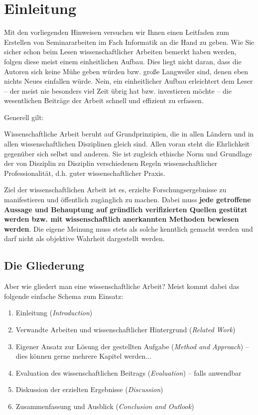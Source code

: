 \section{Einleitung}
\label{sec_einleitung}

\noindent
Mit den vorliegenden Hinweisen versuchen wir Ihnen einen Leitfaden zum Erstellen von Seminararbeiten im Fach Informatik an die Hand zu geben.
Wie Sie sicher schon beim Lesen wissenschaftlicher Arbeiten bemerkt haben werden, folgen diese meist einem einheitlichen Aufbau.
Dies liegt nicht daran, dass die Autoren sich keine Mühe geben würden bzw. große Langweiler sind, denen eben nichts Neues einfallen würde.
Nein, ein einheitlicher Aufbau erleichtert dem Leser -- der meist nie besonders viel Zeit übrig hat bzw. investieren möchte -- die wesentlichen Beiträge der Arbeit schnell und effizient zu erfassen.

\medskip

Generell gilt:
\begin{displayquote}
\glqq Wissenschaftliche Arbeit beruht auf Grundprinzipien, die in allen Ländern und in allen wissenschaftlichen Disziplinen gleich sind. Allen voran steht die Ehrlichkeit gegenüber sich selbst und anderen. Sie ist zugleich ethische Norm und Grundlage der von Disziplin zu Disziplin verschiedenen Regeln wissenschaftlicher Professionalität, d.h. guter wissenschaftlicher Praxis.\grqq \, \cite{dfg:2013}
\end{displayquote}

\medskip

Ziel der wissenschaftlichen Arbeit ist es, erzielte Forschungsergebnisse zu manifestieren und öffentlich zugänglich zu machen. 
Dabei muss \textbf{jede getroffene Aussage und Behauptung auf gründlich verifizierten Quellen gestützt werden bzw. mit wissenschaftlich anerkannten Methoden bewiesen werden}.
Die eigene Meinung muss stets als solche kenntlich gemacht werden und darf nicht als objektive Wahrheit dargestellt werden.

\subsection{Die Gliederung}
Aber wie gliedert man eine wissenschaftliche Arbeit?
Meist kommt dabei das folgende einfache Schema zum Einsatz:
\begin{enumerate}
\item Einleitung (\textit{Introduction})
\item Verwandte Arbeiten und wissenschaftlicher Hintergrund (\textit{Related Work})
\item Eigener Ansatz zur Lösung der gestellten Aufgabe (\textit{Method and Approach}) -- dies können gerne mehrere Kapitel werden...
\item Evaluation des wissenschaftlichen Beitrags (\textit{Evaluation}) -- falls anwendbar
\item Diskussion der erzielten Ergebnisse (\textit{Discussion})
\item Zusammenfassung und Ausblick (\textit{Conclusion and Outlook})
\end{enumerate}


